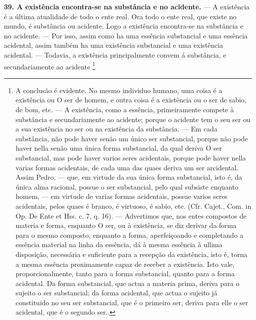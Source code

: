\documentclass[12pt,a4paper]{article}
\newcommand{\pagmark}[1]{\quad[\textit{p.\,#1}]\quad}
\begin{document}
{{{{{{{{{\medskip\noindent\textbf{39. A existência encontra-se na substância e no acidente.}
— A existência é a última atualidade de todo o ente real. Ora
todo o ente real, que existe no mundo, é substância ou acidente.
Logo a existência encontra-se na substância e no acidente. —
Por isso, assim como ha uma essência substancial e uma essência
acidental, assim também ha uma existência substancial e uma
existência acidental. — Todavia, a existência principalmente
convem á substância, e secundariamente ao acidente \footnote{A conclusão é evidente. No mesmo individuo humano, uma coisa
é a existência ou O ser de homem, e outra coisa é a existência ou o ser de
sabio, de bom, etc. — A existência, como a essência, primeiramente compete
à substância e secundariamente ao acidente; porque o acidente tem o seu
ser ou a sua existência no ser ou na existência da substância. — Em cada
substância, não pode haver senão um único ser substancial, porque não pode
haver nella senão uma única forma substancial, da qual deriva O ser substancial, mas pode haver varios seres acidentais, porque pode haver nella
varias formas acidentais, de cada uma das quaes deriva um ser arcidental.
Assim Pedro, — que, em virtude da sua única forma substancial, isto é,
da única alma racional, possue o ser substancial, pelo qual subsiste enquanto
homem, — em virtude de varias formas acidentais, possue varios seres
acidentais, pelos quaes é branco, é virtuoso, é sabio, ete. (Cfr. Cajet., Com.
in Op. De Ente et Hss. c. 7, q. 16). — Advertimos que, nos entes compostos
de materia e forma, enquanto O ser, ou à existência, se diz derivar da forma
para o mesmo composto, enquanto a forma, aperfeiçoando e completando a
\pagmark{312}
essência material na linha da essência, dá à mesma essência à ullima disposição, necessária e suficiente para a recepção da existência, isto é, torna
a mesma essência proximamente capaz de receber a existência. Isto vale,
proporcionalmente, tanto para a forma substancial, quanto para a forma
acidental. Da forma substancial, que actua a materia prima, deriva para
 o sujeito o ser substancial; da forma acidental, que actua o sujeito já
constituido no seu ser substancial, que é o primeiro ser, deriva para elle o
ser acidental, que é o segundo ser.. 
\pagmark{312}

}}}}}}}}}}
\end{document}
